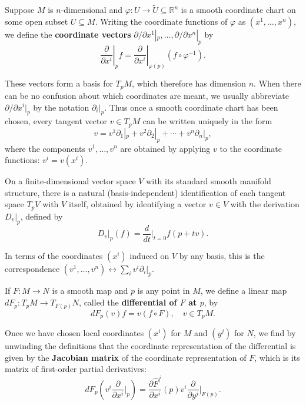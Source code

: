 Suppose $M$ is $n$-dimensional and $\varphi : U \to \tilde{U} \subseteq \mathbb{R}^n$ is a smooth coordinate chart
on some open subset $U \subseteq M$. Writing the coordinate functions of $\varphi$ as $(x^1, \ldots, x^n)$,
we define the \textbf{coordinate vectors} $\partial/\partial x^1|_p, \ldots, \partial/\partial x^n|_p$ by
\begin{equation}
\left.\frac{\partial}{\partial x^i}\right|_p f = \left.\frac{\partial}{\partial x^i}\right|_{\varphi(p)} (f \circ \varphi^{-1}).
\tag{A.2}
\end{equation}

These vectors form a basis for $T_p M$, which therefore has dimension $n$. When there can be no confusion about which coordinates are meant, we usually abbreviate $\partial/\partial x^i|_p$ by the notation $\partial_i|_p$. Thus once a smooth coordinate chart has been chosen, every tangent vector $v \in T_p M$ can be written uniquely in the form
\begin{equation}
v = v^1 \partial_1|_p + v^2 \partial_2|_p + \cdots + v^n \partial_n|_p,
\tag{A.3}
\end{equation}
where the components $v^1, \ldots, v^n$ are obtained by applying $v$ to the coordinate functions: $v^i = v(x^i)$.

On a finite-dimensional vector space $V$ with its standard smooth manifold structure, there is a natural (basis-independent) identification of each tangent space $T_p V$ with $V$ itself, obtained by identifying a vector $v \in V$ with the derivation $D_v|_p$, defined by
\begin{equation}
D_v|_p(f) = \frac{d}{dt}\bigg|_{t=0} f(p + tv).
\end{equation}

In terms of the coordinates $(x^i)$ induced on $V$ by any basis, this is the correspondence $(v^1, \ldots, v^n) \leftrightarrow \sum_i v^i \partial_i|_p$.

If $F: M \to N$ is a smooth map and $p$ is any point in $M$, we define a linear map $dF_p: T_p M \to T_{F(p)} N$, called the \textbf{differential of $F$ at $p$}, by
\begin{equation}
dF_p(v)f = v(f \circ F), \quad v \in T_p M.
\end{equation}

Once we have chosen local coordinates $(x^i)$ for $M$ and $(y^j)$ for $N$, we find by unwinding the definitions that the coordinate representation of the differential is given by the \textbf{Jacobian matrix} of the coordinate representation of $F$, which is its matrix of first-order partial derivatives:
\begin{equation}
dF_p\left(v^i \frac{\partial}{\partial x^i}\bigg|_p\right) = \frac{\partial \hat{F}^j}{\partial x^i}(p) v^i \frac{\partial}{\partial y^j}\bigg|_{F(p)}.
\end{equation}

